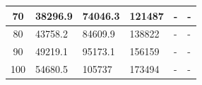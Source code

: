 \begin{table}[htp]
\begin{tabular}{|c|l|l|l|l|l|}
70                                                                         & 38296.9                              & 74046.3                               & 121487                                & -                                     & -                                     \\ \hline
80                                                                         & 43758.2                              & 84609.9                               & 138822                                & -                                     & -                                     \\ \hline
90                                                                         & 49219.1                              & 95173.1                               & 156159                                & -                                     & -                                     \\ \hline
100                                                                        & 54680.5                              & 105737                                & 173494                                & -                                     & -                                     \\ \hline
\end{tabular}
\end{table}

